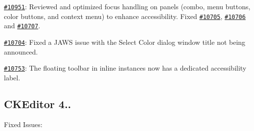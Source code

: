 {\begin{DoxyItemize}
\item \href{http://dev.ckeditor.com/ticket/10951}{\tt \#10951}\+: Reviewed and optimized focus handling on panels (combo, menu buttons, color buttons, and context menu) to enhance accessibility. Fixed \href{http://dev.ckeditor.com/ticket/10705}{\tt \#10705}, \href{http://dev.ckeditor.com/ticket/10706}{\tt \#10706} and \href{http://dev.ckeditor.com/ticket/10707}{\tt \#10707}.
\item \href{http://dev.ckeditor.com/ticket/10704}{\tt \#10704}\+: Fixed a J\+A\+WS issue with the Select Color dialog window title not being announced.
\item \href{http://dev.ckeditor.com/ticket/10753}{\tt \#10753}\+: The floating toolbar in inline instances now has a dedicated accessibility label.
\end{DoxyItemize}}

{\ttfamily \subsection*{C\+K\+Editor 4..}}

{\ttfamily }

{\ttfamily Fixed Issues\+:}

